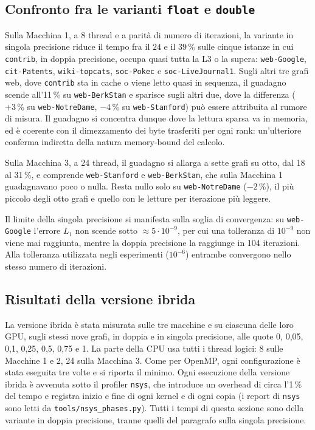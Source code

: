 \documentclass[11pt,a4paper]{article}
\newcommand{\stacco}{\par\medskip\noindent}
\begin{document}
\subsection{Confronto fra le varianti \texttt{float} e \texttt{double}}
Sulla Macchina 1, a 8 thread e a parità di numero di iterazioni, la variante in singola
precisione riduce il tempo fra il $24$ e il $39\,\%$ sulle cinque istanze in
cui \texttt{contrib}, in doppia precisione, occupa quasi tutta la L3 o la
supera: \texttt{web-Google},
\texttt{cit-Patents}, \texttt{wiki-topcats}, \texttt{soc-Pokec} e
\texttt{soc-LiveJournal1}. Sugli altri tre grafi web, dove \texttt{contrib}
sta in cache o viene letto quasi in sequenza, il guadagno scende all'11\,\%
su \texttt{web-BerkStan} e sparisce sugli altri due, dove la differenza ($+3\,\%$ su \texttt{web-NotreDame},
$-4\,\%$ su \texttt{web-Stanford}) può essere attribuita al rumore di misura.
Il guadagno si concentra dunque dove la lettura sparsa va in memoria, ed è coerente
con il dimezzamento dei byte trasferiti per ogni rank: un'ulteriore conferma
indiretta della natura memory-bound del calcolo.

\stacco
Sulla Macchina 3, a 24 thread, il guadagno si allarga a sette grafi su
otto, dal 18 al 31\,\%, e comprende \texttt{web-Stanford} e
\texttt{web-BerkStan}, che sulla Macchina 1 guadagnavano poco o nulla.
Resta nullo solo su \texttt{web-NotreDame}
($-2\,\%$), il più piccolo degli otto grafi e quello con 
le letture per iterazione più leggere.

Il limite della singola precisione si manifesta sulla soglia di
convergenza: su \texttt{web-Google} l'errore $L_1$ non scende sotto
$\approx 5\cdot10^{-9}$, per cui una tolleranza di $10^{-9}$ non viene mai
raggiunta, mentre la doppia precisione la raggiunge in 104 iterazioni. Alla
tolleranza utilizzata negli esperimenti ($10^{-6}$) entrambe convergono
nello stesso numero di iterazioni.

\subsection{Risultati della versione ibrida}
\label{sec:ibrida-risultati}
La versione ibrida è stata misurata sulle tre macchine e su ciascuna
delle loro GPU, sugli stessi nove grafi, in doppia e in singola precisione,
alle quote 0, 0,05, 0,1, 0,25, 0,5, 0,75 e 1. La parte della
CPU usa tutti i thread logici: 8 sulle Macchine 1 e 2, 24 sulla Macchina 3.
Come per OpenMP, ogni configurazione è stata eseguita tre volte e si riporta
il minimo. Ogni esecuzione della versione ibrida è avvenuta sotto il profiler 
\texttt{nsys}, che introduce un overhead di circa l'1\,\% del tempo e registra
inizio e fine di ogni kernel e di ogni copia (i report di \texttt{nsys}
sono letti da \texttt{tools/nsys\_phases.py}). Tutti i tempi di questa
sezione sono della variante in doppia precisione, tranne quelli del
paragrafo sulla singola precisione.
\end{document}
